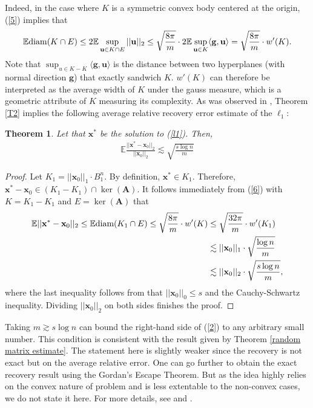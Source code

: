 \documentclass[11pt]{article}
\numberwithin{equation}{section}
\theoremstyle{plain}
\newtheorem{Th}{Theorem}[section]
\theoremstyle{definition}
\newcommand{\diam}{{\rm{diam}}}
\def\E{{\mathbb E}}
\def\A{{\mathbf A}}
\def\x{{\mathbf x}}
\def\g{{\mathbf{g}}}
\def\u{{\mathbf{u}}}
\begin{document}
Indeed, in the case where $K$ is a symmetric convex body centered at the origin, (\ref{5}) implies that
\begin{align}
\E\diam(K\cap E)\leq 2\E\sup_{\u\in K\cap E}||\u||_2\leq \sqrt{\frac{8\pi}{m}}\cdot 2\E\sup_{\u\in K}\langle \g,\u\rangle=\sqrt{\frac{8\pi}{m}}\cdot w'(K). \label{6}
\end{align}   
Note that $\sup_{u\in K-K}\langle \g,\u\rangle$ is the distance between two hyperplanes (with normal direction $\g$) that exactly sandwich $K$. $w'(K)$ can therefore be interpreted as the average width of $K$ under the gauss measure, which is a geometric attribute of $K$ measuring its complexity. As was observed in \cite{vershynin2015estimation},  Theorem \ref{T2} implies the following average relative recovery error estimate of the $\ell_1$: 
\begin{Th}
Let that $\x^*$ be the solution to (\ref{l1}). Then, 
\begin{align}
\E\frac{||\x^*-\x_0||_2}{||\x_0||_2}\lesssim \sqrt{\frac{s\log n}{m}}\label{2}
\end{align}
\end{Th} 

\begin{proof}
Let $K_1=||\x_0||_1\cdot B^n_1$. By definition, $\x^*\in K_1$. Therefore, $\x^*-\x_0\in (K_1-K_1)\cap\ker(\A)$. It follows immediately from (\ref{6}) with $K=K_1-K_1$ and $E=\ker(\A)$ that
\begin{align*}
\E||\x^*-\x_0||_2\leq\E\text{\diam}(K_1\cap E)\leq \sqrt{\frac{8\pi}{m}}\cdot w'(K)&\leq \sqrt{\frac{32\pi}{m}}\cdot w'(K_1)\\
&\lesssim ||\x_0||_1\cdot\sqrt{\frac{\log n}{m}}\\
&\lesssim ||\x_0||_2\cdot\sqrt{\frac{s\log n}{m}},
\end{align*}  
where the last inequality follows from that $||\x_0||_0\leq s$ and the Cauchy-Schwartz inequality. Dividing $||\x_0||_2$ on both sides finishes the proof. 
\end{proof}
Taking $m\gtrsim s\log n$ can bound the right-hand side of (\ref{2}) to any arbitrary small number. This condition is consistent with the result given by Theorem \ref{random matrix estimate}. The statement here is slightly weaker since the recovery is not exact but on the average relative error. One can go further to obtain the exact recovery result using the Gordan's Escape Theorem. But as the idea highly relies on the convex nature of problem and is less extentable to the non-convex cases, we do not state it here. For more details, see \cite{vershynin2015estimation} and \cite{rudelson2008sparse}. 
\end{document}
